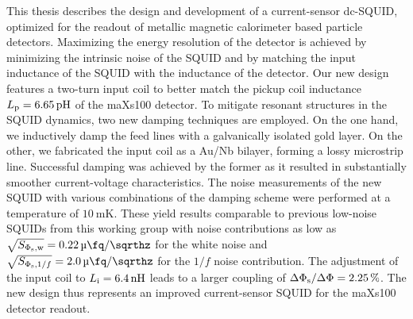 \noindent
This thesis describes the design and development of a current-sensor dc-SQUID, optimized for the readout of metallic magnetic calorimeter based particle detectors. Maximizing the energy resolution of the detector is achieved by minimizing the intrinsic noise of the SQUID and by matching the input inductance of the SQUID with the inductance of the detector. Our new design features a two-turn input coil to better match the pickup coil inductance $L_{\rm p}=\qty{6.65}{\pH}$ of the maXs100 detector. To mitigate resonant structures in the SQUID dynamics, two new damping techniques are employed. 
On the one hand, we inductively damp the feed lines with a galvanically isolated gold layer. On the other, we fabricated the input coil as a Au/Nb bilayer, forming a lossy microstrip line.  
Successful damping was achieved by the former as it resulted in substantially smoother current-voltage characteristics. The noise measurements of the new SQUID with various combinations of the damping scheme were performed at a temperature of $\qty{10}{\milli\kelvin}$. 
These yield results comparable to previous low-noise SQUIDs from this working group with noise contributions as low as  $\sqrt{S_{\Phi_{\rm s}, \rm w}}=\qty{0.22}{\micro\fq\per\sqrthz}$ for the white noise and $\sqrt{S_{\Phi_{\rm s}, 1/f}}=\qty{2.0}{\micro\fq\per\sqrthz}$ for the $1/f$ noise contribution. The adjustment of the input coil to $L_{\rm i}=\qty{6.4}{\nH}$ leads to a larger coupling of $\Delta\Phi_{\rm s}/\Delta\Phi=\qty{2.25}{\percent}$. The new design thus represents an improved current-sensor SQUID for the maXs100 detector readout.


